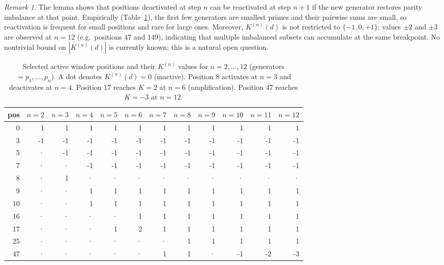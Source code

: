 \documentclass[11pt,a4paper]{amsart}
\theoremstyle{plain}
\theoremstyle{definition}
\theoremstyle{remark}
\newtheorem{remark}[theorem]{Remark}
\begin{document}
\begin{remark}
The lemma shows that positions deactivated at step $n$ can be reactivated
at step $n+1$ if the new generator restores parity imbalance at that point.
Empirically (Table~\ref{tab:positions}), the first few generators are smallest
primes and their pairwise sums are small, so reactivation is frequent for
small positions and rare for large ones.
Moreover, $K^{(n)}(d)$ is not restricted to $\{-1, 0, +1\}$:
values $\pm 2$ and $\pm 3$ are observed at $n = 12$ (e.g.\ positions
$47$ and $149$), indicating that multiple imbalanced subsets can accumulate
at the same breakpoint. No nontrivial bound on $|K^{(n)}(d)|$ is currently
known; this is a natural open question.
\end{remark}

\begin{table}[H]
\centering
\small
\begin{tabular}{r|rrrrrrrrrrr}
\hline
pos & $n{=}2$ & $n{=}3$ & $n{=}4$ & $n{=}5$ & $n{=}6$ &
      $n{=}7$ & $n{=}8$ & $n{=}9$ & $n{=}10$ & $n{=}11$ & $n{=}12$ \\
\hline
 0 &  1 &  1 &  1 &  1 &  1 &  1 &  1 &  1 &  1 &  1 &  1 \\
 3 & -1 & -1 & -1 & -1 & -1 & -1 & -1 & -1 & -1 & -1 & -1 \\
 5 &  · & -1 & -1 & -1 & -1 & -1 & -1 & -1 & -1 & -1 & -1 \\
 7 &  · &  · & -1 & -1 & -1 & -1 & -1 & -1 & -1 & -1 & -1 \\
 8 &  · &  1 &  · &  · &  · &  · &  · &  · &  · &  · &  · \\
 9 &  · &  · &  1 &  1 &  1 &  1 &  1 &  1 &  1 &  1 &  1 \\
10 &  · &  · &  1 &  1 &  1 &  1 &  1 &  1 &  1 &  1 &  1 \\
16 &  · &  · &  · &  · &  1 &  1 &  1 &  1 &  1 &  1 &  1 \\
17 &  · &  · &  · &  1 &  2 &  1 &  1 &  1 &  1 &  1 &  1 \\
25 &  · &  · &  · &  · &  · &  · &  1 &  1 &  1 &  1 &  1 \\
47 &  · &  · &  · &  · &  · &  1 &  1 &  · & -1 & -2 & -3 \\
\hline
\end{tabular}
\caption{Selected active window positions and their $K^{(n)}$ values
for $n = 2,\ldots,12$ (generators $= p_1,\ldots,p_n$).
A dot denotes $K^{(n)}(d) = 0$ (inactive).
Position $8$ activates at $n=3$ and deactivates at $n=4$.
Position $17$ reaches $K=2$ at $n=6$ (amplification).
Position $47$ reaches $K=-3$ at $n=12$.}
\label{tab:positions}
\end{table}
\end{document}
